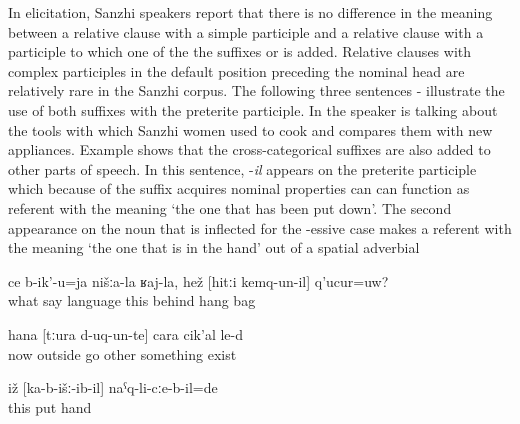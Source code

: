 In elicitation, Sanzhi speakers report that there is no difference in the meaning between a relative clause with a simple participle and a relative clause with a participle to which one of the the suffixes  or  is added. Relative clauses with complex participles in the default position preceding the nominal head are relatively rare in the Sanzhi corpus. The following three sentences - illustrate the use of both suffixes with the preterite participle. In  the speaker is talking about the tools with which Sanzhi women used to cook and compares them with new appliances. Example  shows that the cross-categorical suffixes are also added to other parts of speech. In this sentence, -\textit{il} appears on the preterite participle which because of the suffix acquires nominal properties can can function as referent with the meaning `the one that has been put down'. The second appearance on the noun that is inflected for the -essive case makes a referent with the meaning `the one that is in the hand' out of a spatial adverbial
%
\begin{exe}
	\ex	\label{ex:‎How do we call in our language the back that hangs behind his back?}
	\gll	ce	b-ik'-u=ja	nišːa-la	ʁaj-la,	hež	[hitːi	kemq-un-il]	q'ucur=uw?\\
		what	say		language	this	behind	hang		bag\\
	\glt	{}

	\ex	\label{ex:‎‎‎Now there are other things that appeared (lit. went out)}
	\gll	hana	[tːura	d-uq-un-te]	cara	cik'al	le-d\\
		now	outside	go 	other	something	exist\\
	\glt	{}
	
	\ex	\label{ex:The one that was in the hand had been put down}
\gll	iž	[ka-b-išː-ib-il]	naˁq-li-cːe-b-il=de\\
	this	put	hand\\
	\glt	{}
\end{exe}


